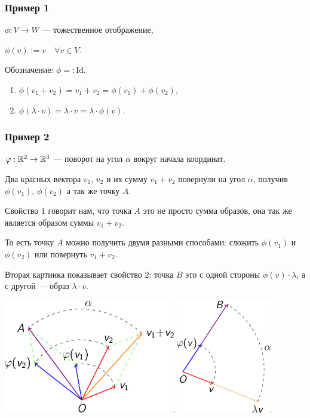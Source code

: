 \subsubsection{Пример 1}

$\phi: V \to W$ --- тожественное отображение,

$\phi(v) := v \quad \forall v \in V$.

Обозначение: $\phi =: \text{Id}$.

\bigskip
\begin{enumerate}[label=\arabic*), nosep]
\item $\phi(v_1 + v_2) = v_1 + v_2 = \phi(v_1) + \phi(v_2)$,
\item $\phi(\lambda \cdot v) = \lambda \cdot v = \lambda \cdot \phi(v)$.
\end{enumerate}

\subsubsection{Пример 2}

$\varphi: \mathbb{R}^2 \to \mathbb{R}^3$ --- поворот на угол $\alpha$ вокруг начала координат. 

\bigskip
Два красных вектора $v_1$, $v_2$ и их сумму $v_1 + v_2$ повернули на угол $\alpha$, получив $\phi(v_1)$, $\phi(v_2)$ а так же точку $A$.

Свойство $1$ говорит нам, что точка $A$ это не просто сумма образов, она так же является образом суммы $v_1 + v_2$.

То есть точку $A$ можно получить двумя разными способами: сложить $\phi(v_1)$ и $\phi(v_2)$ или повернуть $v_1 + v_2$.

\bigskip
Вторая картинка показывает свойство $2$: точка $B$ это с одной стороны $\phi(v) \cdot \lambda$, а с другой --- образ $\lambda \cdot v$. 

\begin{center}
    \includegraphics[height=5cm]{lecture16_example2_1}
    \hspace{2cm}
    \includegraphics[height=5cm]{lecture16_example2_2}
\end{center}

